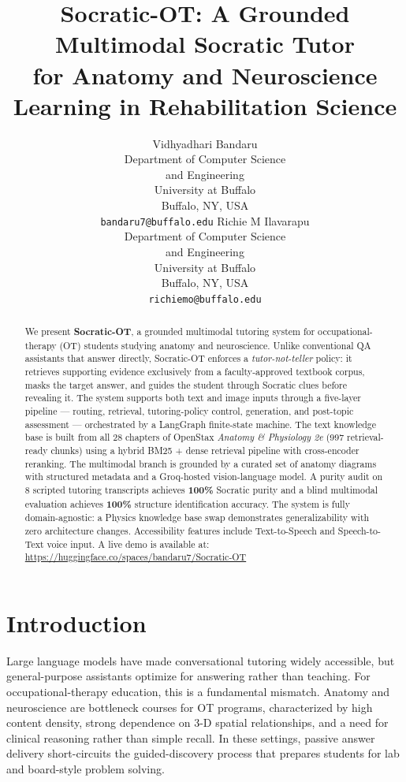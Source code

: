 \documentclass[11pt]{article}
\title{Socratic-OT: A Grounded Multimodal Socratic Tutor\\
for Anatomy and Neuroscience Learning in Rehabilitation Science}
\author{Vidhyadhari Bandaru \\
  Department of Computer Science \\ and Engineering \\
  University at Buffalo \\
  Buffalo, NY, USA \\
  \texttt{bandaru7@buffalo.edu}
  \And
  Richie M Ilavarapu \\
  Department of Computer Science \\ and Engineering \\
  University at Buffalo \\
  Buffalo, NY, USA \\
  \texttt{richiemo@buffalo.edu}}
\begin{document}
\maketitle

\begin{abstract}
We present \textbf{Socratic-OT}, a grounded multimodal tutoring system for
occupational-therapy (OT) students studying anatomy and neuroscience.
Unlike conventional QA assistants that answer directly, Socratic-OT enforces
a \emph{tutor-not-teller} policy: it retrieves supporting evidence exclusively
from a faculty-approved textbook corpus, masks the target answer, and guides
the student through Socratic clues before revealing it.
The system supports both text and image inputs through a five-layer pipeline ---
routing, retrieval, tutoring-policy control, generation, and post-topic
assessment --- orchestrated by a LangGraph finite-state machine.
The text knowledge base is built from all 28 chapters of OpenStax
\emph{Anatomy \& Physiology 2e} \citep{openstax_ap2e} (997 retrieval-ready
chunks) using a hybrid BM25 + dense retrieval pipeline with cross-encoder
reranking.
The multimodal branch is grounded by a curated set of anatomy diagrams with
structured metadata and a Groq-hosted vision-language model.
A purity audit on 8 scripted tutoring transcripts achieves \textbf{100\%}
Socratic purity and a blind multimodal evaluation achieves \textbf{100\%}
structure identification accuracy.
The system is fully domain-agnostic: a Physics knowledge base swap
demonstrates generalizability with zero architecture changes.
Accessibility features include Text-to-Speech and Speech-to-Text voice input.
A live demo is available at: \url{https://huggingface.co/spaces/bandaru7/Socratic-OT}
\end{abstract}

\section{Introduction}

Large language models have made conversational tutoring widely accessible,
but general-purpose assistants optimize for answering rather than teaching.
For occupational-therapy education, this is a fundamental mismatch.
Anatomy and neuroscience are bottleneck courses for OT programs, characterized
by high content density, strong dependence on 3-D spatial relationships, and
a need for clinical reasoning rather than simple recall.
In these settings, passive answer delivery short-circuits the guided-discovery
process that prepares students for lab and board-style problem solving.
\end{document}
